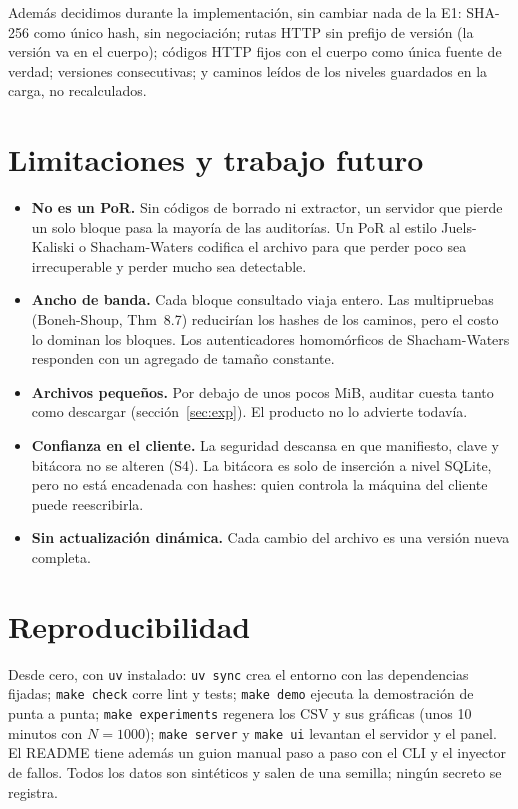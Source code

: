 \documentclass[11pt,a4paper]{article}
\newcommand{\code}[1]{\texttt{#1}}
\begin{document}
Además decidimos durante la implementación, sin cambiar nada de la E1: SHA-256 como único hash, sin
negociación; rutas HTTP sin prefijo de versión (la versión va en el cuerpo); códigos HTTP fijos con
el cuerpo como única fuente de verdad; versiones consecutivas; y caminos leídos de los niveles
guardados en la carga, no recalculados.

\section{Limitaciones y trabajo futuro}
\label{sec:limites}

\begin{itemize}
\item \textbf{No es un PoR.} Sin códigos de borrado ni extractor, un servidor que pierde un solo
  bloque pasa la mayoría de las auditorías. Un PoR al estilo Juels-Kaliski o Shacham-Waters codifica
  el archivo para que perder poco sea irrecuperable y perder mucho sea detectable.
\item \textbf{Ancho de banda.} Cada bloque consultado viaja entero. Las multipruebas
  (Boneh-Shoup, Thm~8.7) reducirían los hashes de los caminos, pero el costo lo dominan los bloques.
  Los autenticadores homomórficos de Shacham-Waters responden con un agregado de tamaño constante.
\item \textbf{Archivos pequeños.} Por debajo de unos pocos MiB, auditar cuesta tanto como descargar
  (sección~\ref{sec:exp}). El producto no lo advierte todavía.
\item \textbf{Confianza en el cliente.} La seguridad descansa en que manifiesto, clave y bitácora no
  se alteren (S4). La bitácora es solo de inserción a nivel SQLite, pero no está encadenada con
  hashes: quien controla la máquina del cliente puede reescribirla.
\item \textbf{Sin actualización dinámica.} Cada cambio del archivo es una versión nueva completa.
\end{itemize}

\section{Reproducibilidad}
\label{sec:repro}

Desde cero, con \code{uv} instalado: \code{uv sync} crea el entorno con las dependencias fijadas;
\code{make check} corre lint y tests; \code{make demo} ejecuta la demostración de punta a punta;
\code{make experiments} regenera los CSV y sus gráficas (unos 10 minutos con $N=1000$);
\code{make server} y \code{make ui} levantan el servidor y el panel. El README tiene además un guion
manual paso a paso con el CLI y el inyector de fallos. Todos los datos son sintéticos y salen de una
semilla; ningún secreto se registra.
\end{document}
